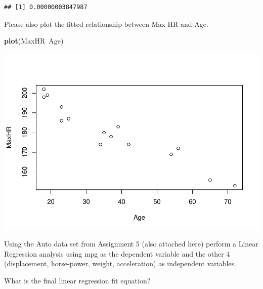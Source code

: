 \documentclass[]{article}
\newenvironment{Shaded}{\begin{snugshade}}{\end{snugshade}}
\newcommand{\KeywordTok}[1]{\textcolor[rgb]{0.13,0.29,0.53}{\textbf{{#1}}}}
\newcommand{\StringTok}[1]{\textcolor[rgb]{0.31,0.60,0.02}{{#1}}}
\newcommand{\NormalTok}[1]{{#1}}
\begin{document}
\begin{verbatim}
## [1] 0.00000003847987
\end{verbatim}

Please also plot the fitted relationship between Max HR and Age.

\begin{Shaded}
\begin{Highlighting}[]
\KeywordTok{plot}\NormalTok{(MaxHR~Age)}
\end{Highlighting}
\end{Shaded}

\includegraphics{CHunt_Assign11_files/figure-latex/unnamed-chunk-4-1.pdf}

\newpage

Using the Auto data set from Assignment 5 (also attached here) perform a
Linear Regression analysis using mpg as the dependent variable and the
other 4 (displacement, horse-power, weight, acceleration) as independent
variables.

What is the final linear regression fit equation?

\begin{Shaded}
\end{Shaded}
\end{document}
